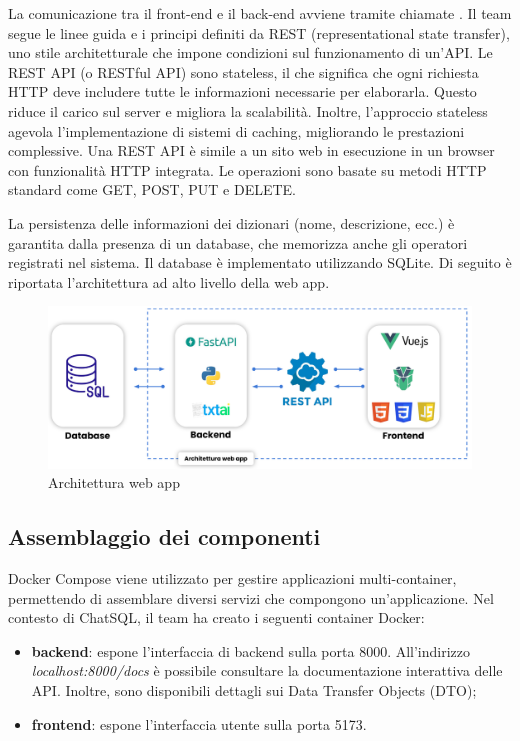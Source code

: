\vspace{0.5\baselineskip}
\par La comunicazione tra il front-end e il back-end avviene tramite chiamate . Il team segue le linee guida e i principi definiti da REST (representational state transfer), uno stile architetturale che impone condizioni sul funzionamento di un'API. Le REST API (o RESTful API) sono stateless, il che significa che ogni richiesta HTTP deve includere tutte le informazioni necessarie per elaborarla. Questo riduce il carico sul server e migliora la scalabilità. Inoltre, l’approccio stateless agevola l'implementazione di sistemi di caching, migliorando le prestazioni complessive. Una REST API è simile a un sito web in esecuzione in un browser con funzionalità HTTP integrata. Le operazioni sono basate su metodi HTTP standard come GET, POST, PUT e DELETE.

\vspace{0.5\baselineskip}
\par La persistenza delle informazioni dei dizionari (nome, descrizione, ecc.) è garantita dalla presenza di un database, che memorizza anche gli operatori registrati nel sistema. Il database è implementato utilizzando SQLite. Di seguito è riportata l'architettura ad alto livello della web app.

\begin{figure}[H]
  \centering
  \includegraphics[width=\textwidth]{assets/architettura_web_app.pdf}
  \caption{Architettura web app}
\end{figure}

\subsection{Assemblaggio dei componenti}
\par Docker Compose viene utilizzato per gestire applicazioni multi-container, permettendo di assemblare diversi servizi che compongono un'applicazione. Nel contesto di ChatSQL, il team ha creato i seguenti container Docker:
\begin{itemize}
  \item \textbf{backend}: espone l'interfaccia di backend sulla porta 8000. All'indirizzo \textit{localhost:8000/docs} è possibile consultare la documentazione interattiva delle API. Inoltre, sono disponibili dettagli sui Data Transfer Objects (DTO);
  \item \textbf{frontend}: espone l'interfaccia utente sulla porta 5173.
\end{itemize}

